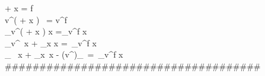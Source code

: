  + \lambda x = f\\[1.5pt]

v^\delta ( + \lambda x ) \ = v^\delta f\\[1.5pt]

\int_\Omega v^\delta ( + \lambda x ) \partial x =\int_\Omega v^\delta  f \partial x\\[1.5pt]

\int_\Omega v^\delta {}\ \partial x + \int_\Omega \lambda x \partial x =\ \int_\Omega v^\delta  f \partial x\\[1.5pt]

\int_\Omega {} \ \partial x + \int_\Omega \lambda x\ \partial x - (v^\delta  {})\Biggm\lvert_\Omega\ =\  \int_\Omega v^\delta  f \partial x \\ [1.5pt]
#####################################
